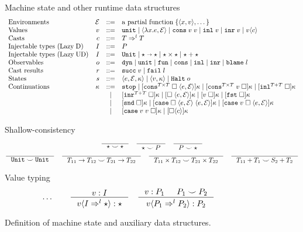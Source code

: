 \documentclass[acmsmall,review]{acmart}\settopmatter{printfolios=true,printccs=false,printacmref=false}
\newcommand{\stxrule}[3]{\text{#2} & #1 & ::= & #3\\}
\newcommand{\stxrulecont}[1]{& & | & #1 \\}
\newcommand{\plus}[0]{+}
\newcommand{\lazyUD}{Lazy\;UD}
\newcommand{\lazyD}{Lazy\;D}
\newcommand{\sOOinspect}[3]{\langle#1,#2,#3\rangle}
\newcommand{\sOOreturn}[2]{\langle#1,#2\rangle}
\newcommand{\sOOhalt}[1]{\mathtt{Halt} \; #1}
\newcommand{\TOOdyn}[0]{\star}
\newcommand{\POOunit}[0]{\mathtt{Unit}}
\newcommand{\POOfun}[2]{#1 \shortrightarrow #2}
\newcommand{\POOprod}[2]{#1 \times #2}
\newcommand{\POOsum}[2]{#1 \plus #2}
\newcommand{\cOOcast}[3]{#1 \Rightarrow^{#2} #3}
\newcommand{\oOOdyn}{\mathtt{dyn}}
\newcommand{\oOOsole}{\mathtt{unit}}
\newcommand{\oOOfun}{\mathtt{fun}}
\newcommand{\oOOcons}{\mathtt{cons}}
\newcommand{\oOOinl}{\mathtt{inl}}
\newcommand{\oOOinr}{\mathtt{inr}}
\newcommand{\oOOblame}[1]{\mathtt{blame} \; #1}
\newcommand{\vOOcast}[2]{#1\langle#2\rangle}
\newcommand{\vOOfun}[3]{\langle \lambda  #2. #3, #1 \rangle}
\newcommand{\vOOtt}[0]{\mathtt{unit}}
\newcommand{\vOOcons}[2]{\mathtt{cons}\;#1\;#2}
\newcommand{\vOOinl}[1]{\mathtt{inl}\;#1}
\newcommand{\vOOinr}[1]{\mathtt{inr}\;#1}
\newcommand{\rOOsucc}[1]{\mathtt{succ}\;#1}
\newcommand{\rOOfail}[1]{\mathtt{fail}\;#1}
\newcommand{\kOOmt}[0]{\mathtt{stop}}
\newcommand{\kOOconsI}[5]{
	[\mathtt{cons}^{\POOprod{#1}{#2}} \; \square \; \langle#3,#4\rangle ]#5}
\newcommand{\kOOconsII}[4]{
	[\mathtt{cons}^{\POOprod{#1}{#2}} \; #3 \; \square]#4}
\newcommand{\kOOinl}[3]{[\mathtt{inl}^{\POOsum{#1}{#2}}\; \square]#3}
\newcommand{\kOOinr}[3]{[\mathtt{inr}^{\POOsum{#1}{#2}}\; \square]#3}
\newcommand{\kOOappI}[3]{
  [\square \; \langle#1,#2\rangle]#3
}
\newcommand{\kOOappII}[2]{
  [#1 \; \square]#2}
\newcommand{\kOOcar}[1]{[\mathtt{fst} \; \square]#1}
\newcommand{\kOOcdr}[1]{[\mathtt{snd} \; \square]#1}
\newcommand{\kOOcaseI}[4]{
  [\mathtt{case} \; \square \; \langle#1,#3\rangle \; \langle#2,#3\rangle ]#4}
\newcommand{\kOOcaseII}[4]{
  [\mathtt{case} \; #1 \; \square \; \langle#2,#3\rangle ]#4}
\newcommand{\kOOcaseIII}[3]{
  [\mathtt{case} \; #1 \; #2 \; \square]#3}
\newcommand{\kOOcast}[2]{
  [\square \langle #1 \rangle]#2}
\begin{document}
\begin{figure}
  Machine state and other runtime data structures
  \[
  \begin{array}{lrcl}
  \stxrule{\mathcal{E}}{Environments}{
  	\text{a partial function}\;\{\langle x , v \rangle , \dots \}
  }
  \stxrule{v}{Values}{
    \vOOtt{} \mid
    \vOOfun{\mathcal{E}}{x}{e} \mid
    \vOOcons{v}{v} \mid
    \vOOinl{v} \mid
    \vOOinr{v} \mid   
    \vOOcast{v}{c}
  }
  \stxrule{c}{Casts}{
    \cOOcast{T}{l}{T}
  }
  \stxrule{I}{Injectable types (\lazyD)}{
    P
  }
  \stxrule{I}{Injectable types (\lazyUD)}{
    \POOunit \mid
    \POOfun{\star}{\star} \mid
    \star \times \star \mid
    \star + \star
  }
  \stxrule{o}{Observables}{
    \oOOdyn \mid
    \oOOsole \mid
    \oOOfun \mid
    \oOOcons \mid
    \oOOinl \mid
    \oOOinr \mid
    \oOOblame{l}
  }
  \stxrule{r}{Cast results}{
    \rOOsucc{v} \mid
    \rOOfail{l}
  }
  \stxrule{s}{States}{
    \sOOinspect{e}{\mathcal{E}}{\kappa} \mid{}
    \sOOreturn{v}{\kappa} \mid{}
    \sOOhalt{o}
  }
  \stxrule{\kappa}{Continuations}{
    \kOOmt \mid
    \kOOconsI{T}{T}{e}{\mathcal{E}}{\kappa} \mid
    \kOOconsII{T}{T}{v}{\kappa} \mid
    \kOOinl{T}{T}{\kappa}
  }
  \stxrulecont{
    \kOOinr{T}{T}{\kappa} \mid
    \kOOappI{e}{\mathcal{E}}{\kappa} \mid
    \kOOappII{v}{\kappa} \mid
    \kOOcar{\kappa}
  }
  \stxrulecont{ 
    \kOOcdr{\kappa}\mid
    \kOOcaseI{e}{e}{\mathcal{E}}{\kappa}\mid
    \kOOcaseII{v}{e}{\mathcal{E}}{\kappa}
  }
  \stxrulecont{
    \kOOcaseIII{v}{v}{\kappa} \mid
    \kOOcast{c}{\kappa}
  }
  \end{array}
  \]

        Shallow-consistency
  \begin{gather*}
  \inference{}{
    \star \smile \star
  } \quad
  \inference{}{
    \star \smile P
  } \quad
  \inference{}{
    P \smile \star
  } \\
  \inference{}{
    \POOunit \smile \POOunit
  } \quad
  \inference{}{
    T_{11} \rightarrow T_{12} \smile T_{21} \rightarrow T_{22}
  } \quad
  \inference{}{
    T_{11} \times T_{12} \smile T_{21} \times T_{22}
  } \quad
  \inference{}{
  T_{11} \plus T_1 \smile S_2 \plus T_2
  }
  \end{gather*}
  
  Value typing 
  \begin{gather*}
  \dots \qquad
  \inference{
    v : I
  }{
    \vOOcast{v}{\cOOcast{I}{l}{\TOOdyn}} : \TOOdyn
  }
  \quad
  \inference{
    v : P_1 &
    P_1 \smile P_2
  }{
    \vOOcast{v}{\cOOcast{P_1}{l}{P_2}} : P_2
  }
  \end{gather*}
        \caption{Definition of machine state and auxiliary data
          structures.}
        \label{fig:state}
\end{figure}
\end{document}
